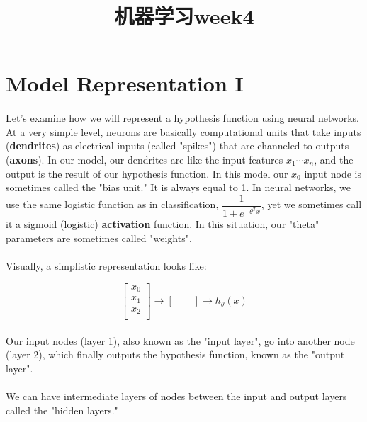 \documentclass[UTF8]{ctexart}
\title{机器学习week4}
\author{  }
\date{}
\begin{document}
\maketitle
\tableofcontents

\newpage
\section{Model Representation I}
\paragraph{}
Let's examine how we will represent a hypothesis function using neural networks. At a very simple level, neurons are basically computational units that take inputs (\textbf{dendrites}) as electrical inputs (called "spikes") that are channeled to outputs (\textbf{axons}). In our model, our dendrites are like the input features $x_{1} \cdots x_{n}$, and the output is the result of our hypothesis function. In this model our $ x_{0} $ input node is sometimes called the "bias unit." It is always equal to 1. In neural networks, we use the same logistic function as in classification, $ \dfrac{1}{1+e^{-\theta^{T}x}} $, yet we sometimes call it a sigmoid (logistic) \textbf{activation} function. In this situation, our "theta" parameters are sometimes called "weights".
\paragraph{}
Visually, a simplistic representation looks like:
\begin{algorithm}
\begin{equation}
\left[\begin{array}{c}
x_{0}\\
x_{1}\\
x_{2}\\
\end{array}\right] \rightarrow  [\qquad]
\rightarrow h_{\theta}(x)
\end{equation}
\end{algorithm}
\paragraph{}
Our input nodes (layer 1), also known as the "input layer", go into another node (layer 2), which finally outputs the hypothesis function, known as the "output layer".
\paragraph{}
We can have intermediate layers of nodes between the input and output layers called the "hidden layers."
\end{document}
